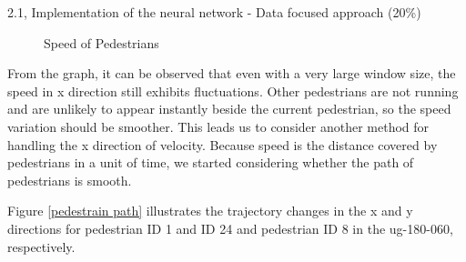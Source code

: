 \begin{task}{2.1, Implementation of the neural network - Data focused approach (20\%)}
\begin{figure}[H]
\caption{Speed of Pedestrians}
\label{pedestrain speed large win}
\end{figure}

From the graph, it can be observed that even with a very large window size, the speed in x direction still exhibits fluctuations. Other pedestrians are not running and are unlikely to appear instantly beside the current pedestrian, so the speed variation should be smoother. This leads us to consider another method for handling the x direction of velocity. Because speed is the distance covered by pedestrians in a unit of time, we started considering whether the path of pedestrians is smooth.

Figure \ref{pedestrain path} illustrates the trajectory changes in the x and y directions for pedestrian ID 1 and ID 24 and pedestrian ID 8 in the ug-180-060, respectively. 


\end{task}
